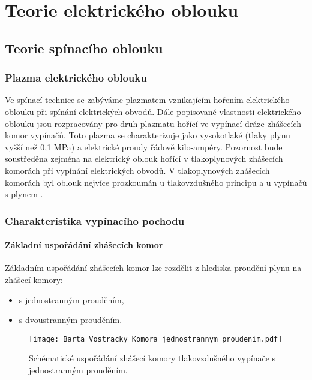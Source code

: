 \chapter{Teorie elektrického oblouku}
\minitoc
\newpage
\section{Teorie spínacího oblouku}
  \subsection{Plazma elektrického oblouku}
    Ve spínací technice se zabýváme plazmatem vznikajícím hořením elektrického oblou\-ku při spínání 
    elektrických obvodů. Dále popisované vlastnosti elektrického oblouku jsou rozpracovány pro druh plazmatu 
    hořící ve vypínací dráze zhášecích komor vypínačů. Toto plazma se charakterizuje jako vysokotlaké (tlaky 
    plynu vyšší než 0,1 MPa) a elektrické proudy řádově kilo-ampéry. Pozornost bude soustředěna zejména na 
    elektrický oblouk hořící v tlakoplynových zhášecích komorách při vypínání elektrických obvodů. V 
    tlakoplynových zhášecích komorách byl oblouk nejvíce prozkoumán u tlakovzdušného principu a u vypínačů s 
    plynem  \cite[s.~3]{BartaVostracky}.
  \subsection{Charakteristika vypínacího pochodu}
    \subsubsection{Základní uspořádání zhášecích komor}
      Základním uspořádání zhášecích komor lze rozdělit z hlediska proudění plynu na zhášecí komory:
      \begin{itemize}
        \item s jednostranným prouděním,
        \item s dvoustranným prouděním.
      \end{itemize}

      \begin{figure}
        \centering
        \texttt{[image: Barta\_Vostracky\_Komora\_jednostrannym\_proudenim.pdf]}
        \caption[Schématické uspořádání zhášecí komory tlakovzdušného vypínače s jednostranným
                 prouděním.]{Schématické uspořádání zhášecí komory tlakovzdušného vypínače s
                 jednostranným prouděním.}
        \label{epr:fig_komora_1stran_proudenim}
      \end{figure}

